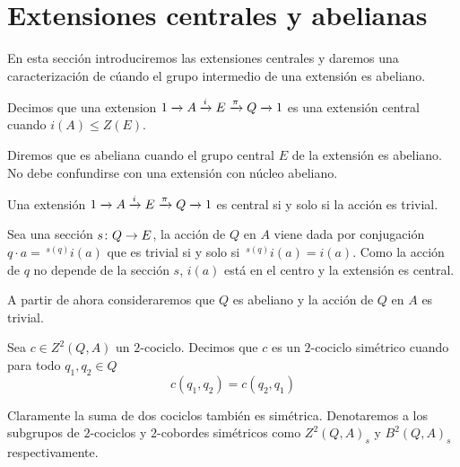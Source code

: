 
\section{Extensiones centrales y abelianas}

En esta sección introduciremos las extensiones centrales y daremos una caracterización de cúando el grupo intermedio de una extensión es abeliano.

\begin{definicion}
	Decimos que una extension $\extension i \pi A E Q$ es una extensión central cuando $i(A)\leq Z(E)$. 
	
	Diremos que es abeliana cuando el grupo central $E$ de la extensión es abeliano. No debe confundirse con una extensión con núcleo abeliano.
\end{definicion}

\begin{proposicion}
	Una extensión $\extension i \pi A E Q$ es central si y solo si la acción es trivial.
	\begin{demostracion}
		Sea una sección $\homo s Q E$, la acción de $Q$ en $A$ viene dada por conjugación $q\cdot a = \,^{s(q)}i(a)$ que es trivial si y solo si $\,^{s(q)}i(a) = i(a)$. Como la acción de $q$ no depende de la sección $s$, $i(a)$ está en el centro y la extensión es central.
	\end{demostracion}
\end{proposicion}

A partir de ahora consideraremos que $Q$ es abeliano y la acción de $Q$ en $A$ es trivial.

\begin{definicion}
	Sea $c\in Z^2(Q,A)$ un $2$-cociclo. Decimos que $c$ es un $2$-cociclo simétrico cuando para todo $q_1,q_2\in Q$
	\begin{equation*}
		c(q_1,q_2)=c(q_2,q_1)
	\end{equation*}
	
	Claramente la suma de dos cociclos también es simétrica. Denotaremos a los subgrupos de $2$-cociclos y $2$-cobordes simétricos como $Z^2(Q,A)_s$ y $B^2(Q,A)_s$ respectivamente.
\end{definicion}


